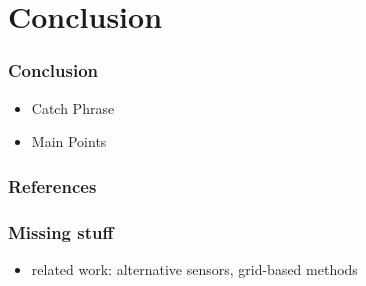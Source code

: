 \section{Conclusion}
\begin{frame}
  \frametitle{Conclusion}
  \begin{itemize}
  \item Catch Phrase
  \item Main Points
  \end{itemize}
\end{frame}



\backupbegin

\begin{frame}[allowframebreaks]
  \frametitle{References}
  
  
\end{frame}

\begin{frame}
  \frametitle{Missing stuff}
  \begin{itemize}
  \item related work: alternative sensors, grid-based methods
  \end{itemize}
\end{frame}

\backupend


